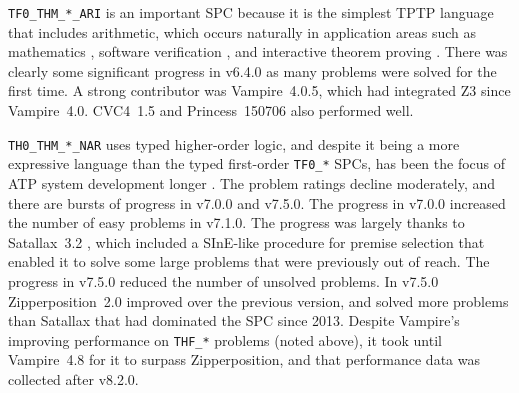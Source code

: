 \documentclass[runningheads]{llncs}
\begin{document}
{\tt TF0\_THM\_*\_ARI} is an important SPC because it is the simplest TPTP language that 
includes arithmetic, which occurs naturally in application areas such as mathematics \cite{KK+23}, 
software verification \cite{BF+15}, and interactive theorem proving \cite{PB10}.
There was clearly some significant progress in v6.4.0 as many problems were solved for the
first time.
A strong contributor was Vampire~4.0.5, which had integrated Z3 \cite{dMB08} since Vampire~4.0.
CVC4~1.5 \cite{BC+11} and Princess~150706 \cite{Rue08} also performed well.

{\tt TH0\_THM\_*\_NAR} uses typed higher-order logic, and despite it being a more expressive
language than the typed first-order {\tt TF0\_*} SPCs, has been the focus of ATP system development
longer \cite{SB10,SS+12}.
The problem ratings decline moderately, and there are bursts of progress in v7.0.0 and v7.5.0.
The progress in v7.0.0 increased the number of easy problems in v7.1.0.
The progress was largely thanks to Satallax~3.2 \cite{Bro12}, which included a SInE-like 
\cite{HV11} procedure for premise selection that enabled it to solve some large problems that 
were previously out of reach. 
The progress in v7.5.0 reduced the number of unsolved problems.
In v7.5.0 Zipperposition~2.0 \cite{BB+19-CADE} improved over the previous version, and solved
more problems than Satallax that had dominated the SPC since 2013.
Despite Vampire's improving performance on {\tt THF\_*} problems (noted above), it took until
Vampire~4.8 for it to surpass Zipperposition, and that performance data was collected after v8.2.0.
\end{document}
